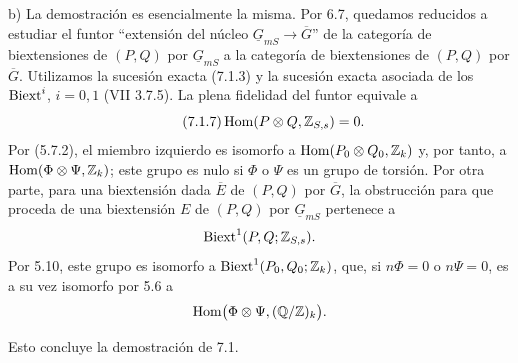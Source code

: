 \smallskip
\noindent b) La demostración es esencialmente la misma. Por 6.7,
quedamos reducidos a estudiar el funtor ``extensión del núcleo
$\underline G_{mS}\to\overline G$'' de la categoría de biextensiones
de $(P,Q)$ por $\underline G_{mS}$ a la categoría de biextensiones de
$(P,Q)$ por $\overline G$. Utilizamos la sucesión exacta (7.1.3) y la
sucesión exacta asociada de los $\Biext^i$, $i=0,1$ (VII 3.7.5). La
plena fidelidad del funtor equivale a
\begin{equation}\tag{7.1.7}
 \Hom(P\otimes Q,\mathbb Z_{S,s})=0.
\end{equation}
Por (5.7.2), el miembro izquierdo es isomorfo a
$\Hom(P_0\otimes Q_0,\mathbb Z_k)$ y, por tanto, a
$\Hom(\Phi\otimes\Psi,\mathbb Z_k)$; este grupo es nulo si $\Phi$ o
$\Psi$ es un grupo de torsión. Por otra parte, para una biextensión
dada $\overline E$ de $(P,Q)$ por $\overline G$, la obstrucción para
que proceda de una biextensión $E$ de $(P,Q)$ por $\underline G_{mS}$
pertenece a
\[
 \Biext^1(P,Q;\mathbb Z_{S,s}).
\]
Por 5.10, este grupo es isomorfo a
$\Biext^1(P_0,Q_0;\mathbb Z_k)$, que, si $n\Phi=0$ o $n\Psi=0$, es a
su vez isomorfo por 5.6 a
\[
 \Hom\bigl(\Phi\otimes\Psi,
 \sisi{\mathbb Q/\mathbb Z}{(\mathbb Q/\mathbb Z)_k}\bigr).
\]


Esto concluye la demostración de 7.1.
